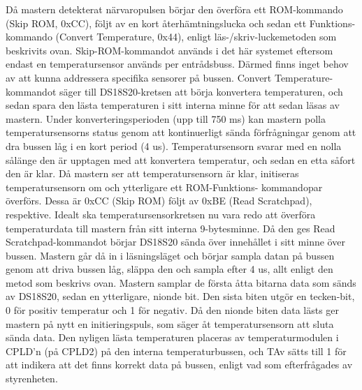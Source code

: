 \documentclass[a4paper,11pt]{article}
\begin{document}
	Då mastern detekterat närvaropulsen börjar den överföra ett ROM-kommando (Skip ROM, 0xCC), följt av en kort 		återhämtningslucka och sedan ett Funktions-kommando (Convert Temperature, 0x44), enligt läs-/skriv-luckemetoden som 		beskrivits ovan.
	Skip-ROM-kommandot används i det här systemet eftersom endast en temperatursensor används per entrådsbuss.
	Därmed finns inget behov av att kunna addressera specifika sensorer på bussen.
	Convert Temperature-kommandot säger till DS18S20-kretsen att börja konvertera temperaturen, och sedan spara den 
	lästa temperaturen i sitt interna minne för att sedan läsas av mastern.
	Under konverteringsperioden (upp till 750 ms) kan mastern polla temperatursensorns status genom att kontinuerligt
	sända förfrågningar genom att dra bussen låg i en kort period (4 us). Temperatursensorn svarar med en nolla
	sålänge den är upptagen med att konvertera temperatur, och sedan en etta såfort den är klar.
	Då mastern ser att temperatursensorn är klar, initiseras temperatursensorn om och ytterligare ett ROM-Funktions- 		kommandopar överförs. Dessa är 0xCC (Skip ROM) följt av 0xBE (Read Scratchpad), respektive.
	Idealt ska temperatursensorkretsen nu vara redo att överföra temperaturdata till mastern från sitt interna 
	9-bytesminne.
	Då den ges Read Scratchpad-kommandot börjar DS18S20 sända över innehållet i sitt minne över bussen.
	Mastern går då in i läsningsläget och börjar sampla datan på bussen genom att driva bussen låg, släppa den och sampla efter 4 us,
	allt enligt den metod som beskrivs ovan. Mastern samplar de första åtta bitarna data som sänds av DS18S20, sedan en ytterligare,
	nionde bit. Den sista biten utgör en tecken-bit, 0 för positiv temperatur och 1 för negativ. Då den nionde biten data lästs
	ger mastern på nytt en initieringspuls, som säger åt temperatursensorn att sluta sända data.
	Den nyligen lästa temperaturen placeras av temperaturmodulen i CPLD'n (på CPLD2) på den interna temperaturbussen, och
	TAv sätts till 1 för att indikera att det finns korrekt data på bussen, enligt vad som efterfrågades av styrenheten.
\end{document}
